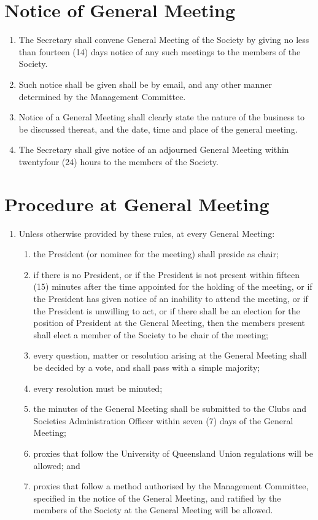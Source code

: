 \documentclass[a4paper]{article}
\begin{document}
\section{Notice of General Meeting}
\begin{enumerate}
\item The Secretary shall convene General Meeting of the Society by giving no less than fourteen (14) days notice of any such meetings to the members of the Society.
\item Such notice shall be given shall be by e\textendash mail, and any other manner determined by the Management Committee.
\item Notice of a General Meeting shall clearly state the nature of the business to be discussed thereat, and the date, time and place of the general meeting.
\item  The Secretary shall give notice of an adjourned General Meeting within twenty\textendash four (24) hours to the members of the Society.
\end{enumerate}

\section{Procedure at General Meeting}
\begin{enumerate}
\item Unless otherwise provided by these rules, at every General Meeting:
	\begin{enumerate}
	\item the President (or nominee for the meeting) shall preside as chair;
	\item if there is no President, or if the President is not present within fifteen (15) minutes after the time appointed for the holding of the meeting, or if the President has given notice of an inability to attend the meeting, or if the President is unwilling to act, or if there shall be an election for the position of President at the General Meeting, then the members present shall elect a member of the Society to be chair of the meeting;
	\item every question, matter or resolution arising at the General Meeting shall be decided by a vote, and shall pass with a simple majority;
	\item every resolution must be minuted;
	\item the minutes of the General Meeting shall be submitted to the Clubs and Societies Administration Officer within seven (7) days of the General Meeting;
	\item proxies that follow the University of Queensland Union regulations will be allowed; and
	\item proxies that follow a method authorised by the Management Committee, specified in the notice of the General Meeting, and ratified by the members of the Society at the General Meeting will be allowed.
	\end{enumerate}
\end{enumerate}
\end{document}
